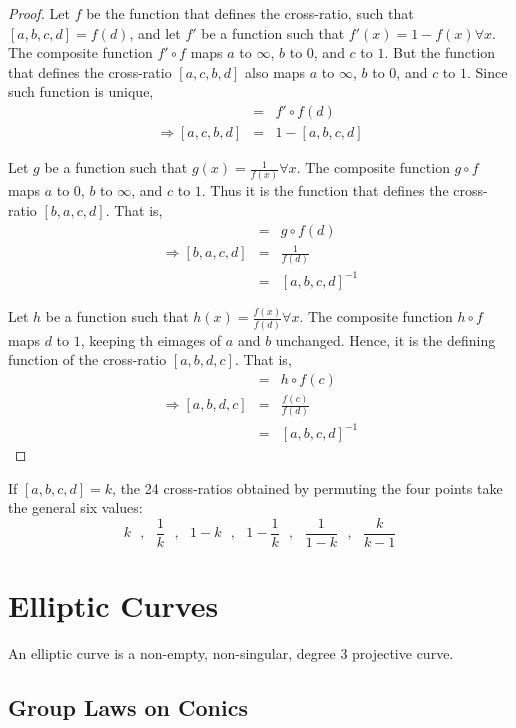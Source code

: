 \begin{proof}
  Let $f$ be the function that defines the cross-ratio, such that $[a,b,c,d]=f(d)$, and let
  $f'$ be a function such that $f'(x)=1-f(x)\forall x$. The composite function $f'\circ f$ maps
  $a$ to $\infty$, $b$ to $0$, and $c$ to $1$. But the function that defines the cross-ratio
  $[a,c,b,d]$ also maps $a$ to $\infty$, $b$ to $0$, and $c$ to $1$. Since such function is
  unique,
  \begin{eqnarray*}
    [a,c,b,d] &=& f'\circ f(d) \\
    \Longrightarrow [a,c,b,d] &=& 1-[a,b,c,d]
  \end{eqnarray*}

  Let $g$ be a function such that $g(x)=\frac{1}{f(x)}\forall x$. The composite function
  $g\circ f$ maps $a$ to $0$, $b$ to $\infty$, and $c$ to $1$. Thus it is the function that
  defines the cross-ratio $[b,a,c,d]$. That is,
  \begin{eqnarray*}
    [b,a,c,d] &=& g\circ f(d) \\
    \Longrightarrow [b,a,c,d] &=& \frac{1}{f(d)} \\
                              &=& [a,b,c,d]^{-1}
  \end{eqnarray*}

  Let $h$ be a function such that $h(x)=\frac{f(x)}{f(d)}\forall x$. The composite function
  $h\circ f$ maps $d$ to $1$, keeping th eimages of $a$ and $b$ unchanged. Hence, it is the
  defining function of the cross-ratio $[a,b,d,c]$. That is,
  \begin{eqnarray*}
    [a,b,d,c] &=& h\circ f(c) \\
    \Longrightarrow [a,b,d,c] &=& \frac{f(c)}{f(d)} \\
                              &=& [a,b,c,d]^{-1}
  \end{eqnarray*}
\end{proof}

\begin{remark}
  If $[a,b,c,d]=k$, the 24 cross-ratios obtained by permuting the four points take the general
  six values:
  \[
    k \hspace{8pt},\hspace{8pt} \frac{1}{k} \hspace{8pt},
    \hspace{8pt} 1-k \hspace{8pt},\hspace{8pt} 1-\frac{1}{k} \hspace{8pt},
    \hspace{8pt} \frac{1}{1-k} \hspace{8pt},\hspace{8pt} \frac{k}{k-1}
  \]
\end{remark}

\section{Elliptic Curves}

\begin{definition}
  An elliptic curve is a non-empty, non-singular, degree 3 projective curve. \cite{spallone}
\end{definition}

\subsection{Group Laws on Conics}
